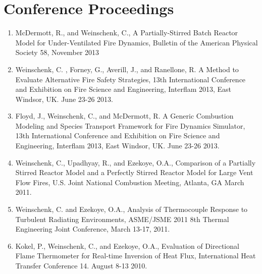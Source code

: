 \documentclass[10pt,letterpaper]{article}
\begin{document}
\section*{Conference Proceedings}
\begin{enumerate}
\item McDermott, R., and Weinschenk, C., A Partially-Stirred Batch Reactor Model for Under-Ventilated Fire Dynamics, Bulletin of the American Physical Society 58, November 2013
\item Weinschenk, C. , Forney, G., Averill, J., and Ranellone, R. A Method to Evaluate Alternative Fire Safety Strategies, 13th International Conference and Exhibition on Fire Science and Engineering, Interflam 2013, East Windsor, UK. June 23-26 2013.
\item Floyd, J., Weinschenk, C., and McDermott, R. A Generic Combustion Modeling and Species Transport Framework for Fire Dynamics Simulator, 13th International Conference and Exhibition on Fire Science and Engineering, Interflam 2013, East Windsor, UK. June 23-26 2013.
\item Weinschenk, C., Upadhyay, R., and Ezekoye, O.A., Comparison of a Partially Stirred Reactor Model and a Perfectly Stirred Reactor Model for Large Vent Flow Fires, U.S. Joint National Combustion Meeting, Atlanta, GA March 2011.
\item Weinschenk, C. and Ezekoye, O.A., Analysis of Thermocouple Response to Turbulent Radiating Environments, ASME/JSME 2011 8th Thermal Engineering Joint Conference, March 13-17, 2011.
\item  Kokel, P., Weinschenk, C., and Ezekoye, O.A., Evaluation of Directional Flame Thermometer for Real-time Inversion of Heat Flux, International Heat Transfer Conference 14. August 8-13 2010.
\end{enumerate}
\end{document}
